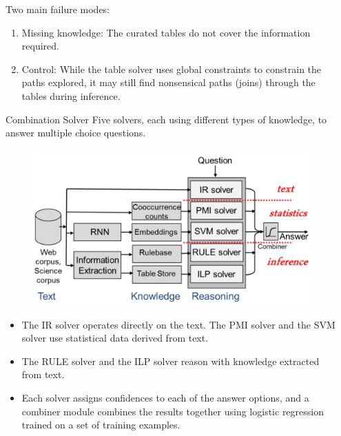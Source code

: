 \documentclass[final]{beamer}
\newlength{\sepwid}
\newlength{\onecolwid}
\begin{document}
\begin{frame}[t]
\begin{columns}[t]
\begin{column}{\sepwid}\end{column} %

\begin{column}{\onecolwid} %

\begin{block}{}
		Two main failure modes:
		\begin{enumerate}
			\item Missing knowledge: The curated tables do not cover the
			information required.
			\item Control: While the table solver uses global constraints to
			constrain the paths explored, it may still find nonsensical
			paths (joins) through the tables during inference.
		\end{enumerate}
\end{block}

\begin{block}{Combination Solver}
Five solvers, each using different types of knowledge, to answer multiple choice questions.
\begin{figure}
	\includegraphics[scale=0.8]{combination.png}
\end{figure}
\begin{itemize}
	\item The IR solver operates directly on the text. The
	PMI solver and the SVM solver use statistical data derived
	from text.
	\item  The RULE solver and the ILP solver reason with
	knowledge extracted from text. 
	\item Each solver assigns confidences to each of the answer options, and a combiner module combines the results together using logistic regression
	trained on a set of training examples.
\end{itemize}


\end{block}
\end{column}
\end{columns}
\end{frame}
\end{document}
